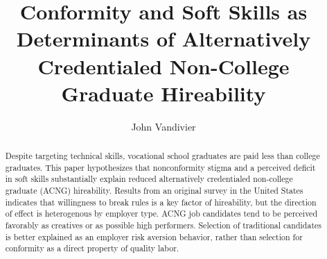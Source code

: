\documentclass[review]{elsarticle}
\begin{document}
\begin{frontmatter}

    \title{
        Conformity and Soft Skills as Determinants of Alternatively Credentialed Non-College Graduate Hireability
    }

    \author[mymainaddress]{John Vandivier}
    \address[mymainaddress]{4400 University Dr, Fairfax, VA 22030}

    \begin{abstract}
        Despite targeting technical skills,
        vocational school graduates are paid less than college graduates.
        This paper hypothesizes that nonconformity stigma and a perceived deficit in soft skills substantially explain reduced alternatively credentialed non-college graduate (ACNG) hireability.
        Results from an original survey in the United States indicates that willingness to break rules is a key factor of hireability,
        but the direction of effect is heterogenous by employer type.
        ACNG job candidates tend to be perceived favorably as creatives or as possible high performers.
        Selection of traditional candidates is better explained as an employer risk aversion behavior,
        rather than selection for conformity as a direct property of quality labor.

\end{abstract}
\end{frontmatter}
\end{document}
